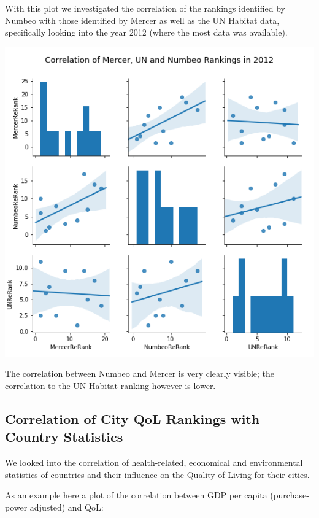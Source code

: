 \documentclass[
  twocolumn]{article}
\begin{document}
With this plot we investigated the correlation of the rankings
identified by Numbeo with those identified by Mercer as well as the UN
Habitat data, specifically looking into the year 2012 (where the most
data was available).

\includegraphics[width=1\linewidth]{visuals/CorrelationOfMercerAndUNAndNumbeoRanking2012}

The correlation between Numbeo and Mercer is very clearly visible; the
correlation to the UN Habitat ranking however is lower.

\hypertarget{correlation-of-city-qol-rankings-with-country-statistics}{%
\subsection{Correlation of City QoL Rankings with Country
Statistics}\label{correlation-of-city-qol-rankings-with-country-statistics}}

We looked into the correlation of health-related, economical and
environmental statistics of countries and their influence on the Quality
of Living for their cities.

As an example here a plot of the correlation between GDP per capita
(purchase-power adjusted) and QoL:
\end{document}
